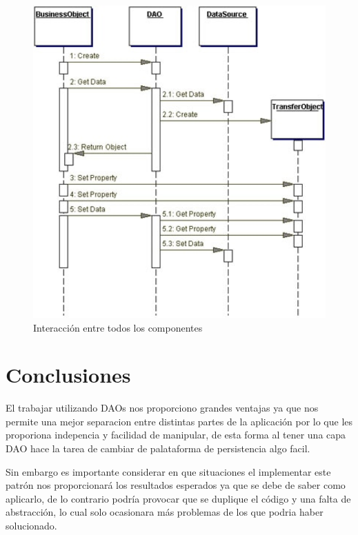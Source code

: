 \documentclass[a4paper,12pt]{article}
\begin{document}
\begin{figure}[H]
\begin{center}
 \includegraphics[width=13cm]{interaccion.jpg}
 \caption{Interacción entre todos los componentes \cite{oracle}}
 \label{fig:interaccion}
\end{center}
\end{figure}

\section{Conclusiones}
El trabajar utilizando DAOs nos proporciono grandes ventajas ya que nos permite 
una mejor separacion entre distintas partes de la aplicación por lo que les 
proporiona indepencia y facilidad de manipular, de esta forma al tener una capa 
DAO hace la tarea de cambiar de palataforma de persistencia algo facil.

Sin embargo es importante considerar en que situaciones el implementar este 
patrón nos proporcionará los resultados esperados ya que se debe de saber como 
aplicarlo, de lo contrario podría provocar que se duplique el código y una 
falta de abstracción, lo cual solo ocasionara más problemas de los que podria 
haber solucionado.




\end{document}
